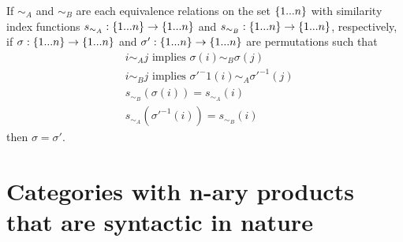 \documentclass[10pt,a4paper]{scrartcl}
\begin{document}
\begin{lemma}
If $\sim_A$ and $\sim_B$ are each equivalence relations on the set $\left\{1...n\right\}$ 
with similarity index functions $s_{\sim_A}: \left\{1...n\right\} \rightarrow \left\{1...n\right\}$
and $s_{\sim_B}: \left\{1...n\right\} \rightarrow \left\{1...n\right\}$, respectively,  if
$\sigma: \left\{1...n\right\} \rightarrow \left\{1...n\right\}$ and $\sigma': \left\{1...n\right\} \rightarrow \left\{1...n\right\}$ are permutations 
such that
\begin{align}
&i \sim_A j \mbox{ implies } \sigma(i) \sim_B \sigma(j) \\
&i \sim_B j \mbox{ implies } \sigma'^-1(i) \sim_A \sigma'^{-1}(j) \\
&s_{\sim_B}(\sigma(i))=s_{\sim_A}(i) \\
&s_{\sim_A}(\sigma'^{-1}(i))=s_{\sim_B}(i) 
\end{align}
then $\sigma=\sigma'$.
\end{lemma}
\section{Categories with n-ary products that are syntactic in nature}
\end{document}
